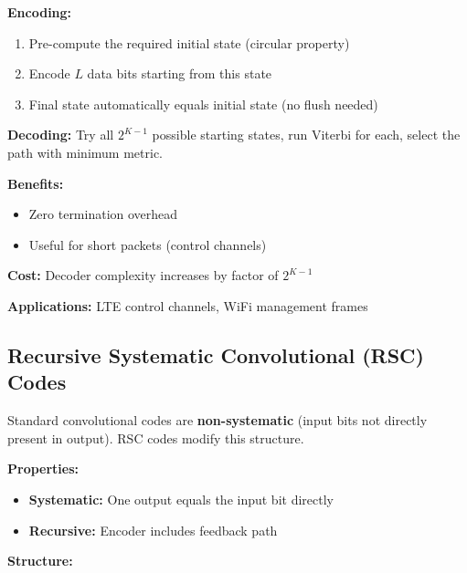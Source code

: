 \textbf{Encoding:}
\begin{enumerate}
\item Pre-compute the required initial state (circular property)
\item Encode $L$ data bits starting from this state
\item Final state automatically equals initial state (no flush needed)
\end{enumerate}

\textbf{Decoding:} Try all $2^{K-1}$ possible starting states, run Viterbi for each, select the path with minimum metric.

\textbf{Benefits:}
\begin{itemize}
\item Zero termination overhead
\item Useful for short packets (control channels)
\end{itemize}

\textbf{Cost:} Decoder complexity increases by factor of $2^{K-1}$

\textbf{Applications:} LTE control channels, WiFi management frames

\subsection{Recursive Systematic Convolutional (RSC) Codes}

Standard convolutional codes are \textbf{non-systematic} (input bits not directly present in output). RSC codes modify this structure.

\textbf{Properties:}
\begin{itemize}
\item \textbf{Systematic:} One output equals the input bit directly
\item \textbf{Recursive:} Encoder includes feedback path
\end{itemize}

\textbf{Structure:}
\begin{center}
\end{center}

